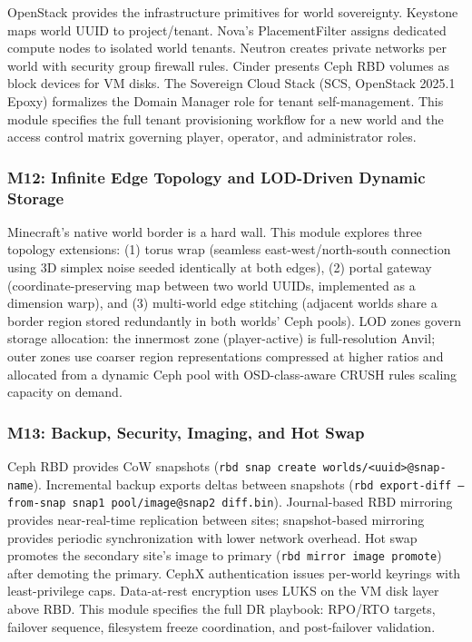 \documentclass[11pt,letterpaper]{article}
\begin{document}
OpenStack provides the infrastructure primitives for world sovereignty. Keystone maps world UUID to project/tenant. Nova's PlacementFilter assigns dedicated compute nodes to isolated world tenants. Neutron creates private networks per world with security group firewall rules. Cinder presents Ceph RBD volumes as block devices for VM disks. The Sovereign Cloud Stack (SCS, OpenStack 2025.1 Epoxy) formalizes the Domain Manager role for tenant self-management. This module specifies the full tenant provisioning workflow for a new world and the access control matrix governing player, operator, and administrator roles.

\subsubsection{M12: Infinite Edge Topology and LOD-Driven Dynamic Storage}

Minecraft's native world border is a hard wall. This module explores three topology extensions: (1) torus wrap (seamless east-west/north-south connection using 3D simplex noise seeded identically at both edges), (2) portal gateway (coordinate-preserving map between two world UUIDs, implemented as a dimension warp), and (3) multi-world edge stitching (adjacent worlds share a border region stored redundantly in both worlds' Ceph pools). LOD zones govern storage allocation: the innermost zone (player-active) is full-resolution Anvil; outer zones use coarser region representations compressed at higher ratios and allocated from a dynamic Ceph pool with OSD-class-aware CRUSH rules scaling capacity on demand.

\subsubsection{M13: Backup, Security, Imaging, and Hot Swap}

Ceph RBD provides CoW snapshots (\texttt{rbd snap create worlds/<uuid>@snap-name}). Incremental backup exports deltas between snapshots (\texttt{rbd export-diff --from-snap snap1 pool/image@snap2 diff.bin}). Journal-based RBD mirroring provides near-real-time replication between sites; snapshot-based mirroring provides periodic synchronization with lower network overhead. Hot swap promotes the secondary site's image to primary (\texttt{rbd mirror image promote}) after demoting the primary. CephX authentication issues per-world keyrings with least-privilege caps. Data-at-rest encryption uses LUKS on the VM disk layer above RBD. This module specifies the full DR playbook: RPO/RTO targets, failover sequence, filesystem freeze coordination, and post-failover validation.
\end{document}
